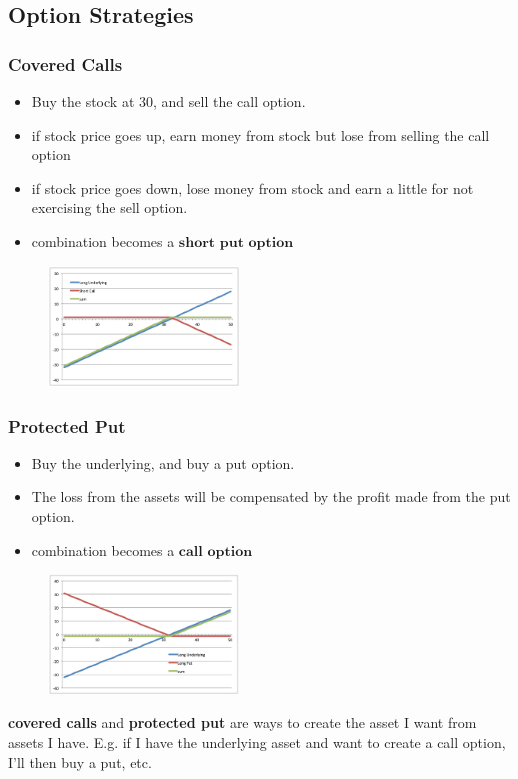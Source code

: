 \begin{multicols}{2}
\subsection{Option Strategies}
\subsubsection{Covered Calls}
\begin{itemize}
    \item Buy the stock at 30, and sell the call option. 
    \item if stock price goes up, earn money from stock but lose from selling the call option
    \item if stock price goes down, lose money from stock and earn a little for not exercising the sell option. 
    \item combination becomes a $\boxed{\textbf{short put option}}$
\end{itemize}
\begin{figure}[H]
    \centering 
    \includegraphics[width =0.45\textwidth]{Figure/cover_call.png}
\end{figure}

\subsubsection{Protected Put}
\begin{itemize}
    \item Buy the underlying, and buy a put option.
    \item The loss from the assets will be compensated by the profit made from the put option. 
    \item combination becomes a $\boxed{\textbf{call option}}$
\end{itemize}
\begin{figure}[H]
    \centering 
    \includegraphics[width =0.45\textwidth]{Figure/protect_put.png}
\end{figure}
\textbf{covered calls} and \textbf{protected put} are ways to create the asset I want from assets I have. E.g. if I have the underlying asset and want to create a call option, I'll then buy a put, etc. 


\end{multicols}
